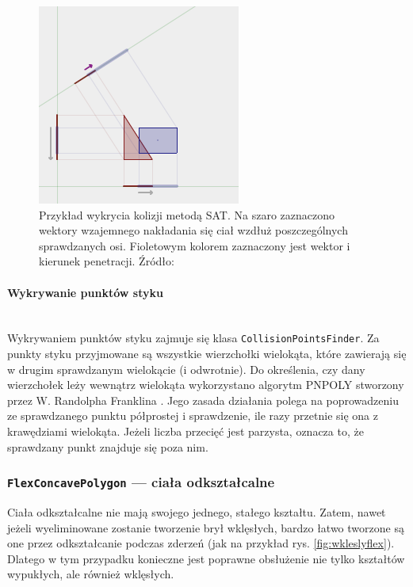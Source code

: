 

\begin{figure}[h]
	\centering
	\includegraphics[width=0.7\linewidth]{images/przyklad-sat}
	\caption[Przykład wykrycia kolizji metodą SAT]{Przykład wykrycia kolizji metodą SAT. Na szaro zaznaczono wektory wzajemnego nakładania się ciał wzdłuż poszczególnych sprawdzanych osi. Fioletowym kolorem zaznaczony jest wektor i kierunek penetracji.\newline
		Źródło: \cite{bib:ncollision}}
	\label{fig:przyklad-sat}
\end{figure}

\paragraph*{Wykrywanie punktów styku} \ \\ 
Wykrywaniem punktów styku zajmuje się klasa \verb|CollisionPointsFinder|. Za punkty styku przyjmowane są wszystkie wierzchołki wielokąta, które zawierają się w drugim sprawdzanym wielokącie (i odwrotnie). Do określenia, czy dany wierzchołek leży wewnątrz wielokąta wykorzystano algorytm PNPOLY stworzony przez W. Randolpha Franklina \cite{bib:pnpoly}. Jego zasada działania polega na poprowadzeniu ze sprawdzanego punktu półprostej i sprawdzenie, ile razy przetnie się ona z krawędziami wielokąta. Jeżeli liczba przecięć jest parzysta, oznacza to, że sprawdzany punkt znajduje się poza nim. 

\subsubsection{\texttt{FlexConcavePolygon} --- ciała odkształcalne}
Ciała odkształcalne nie mają swojego jednego, stałego kształtu. Zatem, nawet jeżeli wyeliminowane zostanie tworzenie brył wklęsłych, bardzo łatwo tworzone są one przez odkształcanie podczas zderzeń (jak na przykład rys. \ref{fig:wkleslyflex}). Dlatego w tym przypadku konieczne jest poprawne obsłużenie nie tylko kształtów wypukłych, ale również wklęsłych.

